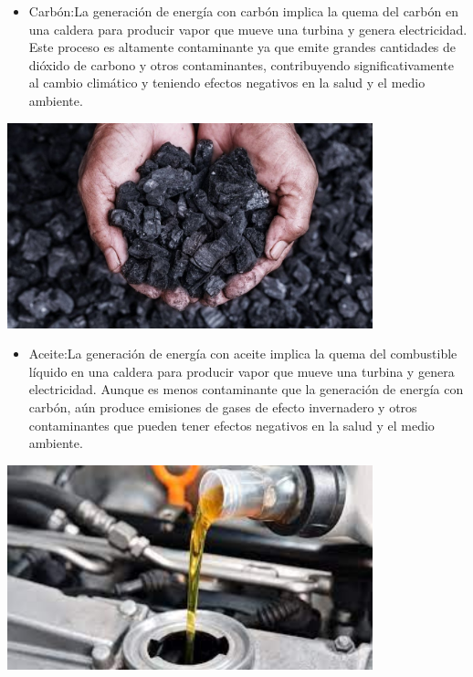 \documentclass[
]{article}
\providecommand{\tightlist}{%
  \setlength{\itemsep}{0pt}\setlength{\parskip}{0pt}}
\begin{document}
\begin{itemize}
\tightlist
\item
  Carbón:La generación de energía con carbón implica la quema del carbón
  en una caldera para producir vapor que mueve una turbina y genera
  electricidad. Este proceso es altamente contaminante ya que emite
  grandes cantidades de dióxido de carbono y otros contaminantes,
  contribuyendo significativamente al cambio climático y teniendo
  efectos negativos en la salud y el medio ambiente.
\end{itemize}

\includegraphics[width=4.16667in,height=\textheight]{carbon.jpeg}

\begin{itemize}
\tightlist
\item
  Aceite:La generación de energía con aceite implica la quema del
  combustible líquido en una caldera para producir vapor que mueve una
  turbina y genera electricidad. Aunque es menos contaminante que la
  generación de energía con carbón, aún produce emisiones de gases de
  efecto invernadero y otros contaminantes que pueden tener efectos
  negativos en la salud y el medio ambiente.
\end{itemize}

\usepackage{floatrow}

\includegraphics[width=4.16667in,height=\textheight]{aceite.jpeg}
\end{document}
